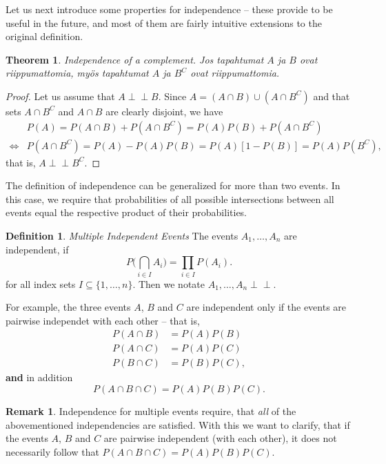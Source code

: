 \documentclass[12pt,a4paper,leqno]{report}
\def\independent{\perp\!\!\!\perp}
\theoremstyle{plain}
\newtheorem{lause}[equation]{Theorem}
\theoremstyle{definition}
\newtheorem{maar}[equation]{Definition}
\newtheorem{remark}[equation]{Remark}
\begin{document}
\bigskip

Let us next introduce some properties for independence -- these provide to be useful in the future, and most of them are fairly intuitive extensions to the original definition.

\begin{lause}\label{lause:indept_complement}
Independence of a complement.  Jos tapahtumat $A$ ja $B$ ovat riippumattomia, myös tapahtumat $A$ ja $B^C$ ovat riippumattomia.
\end{lause}

\begin{proof}
Let us assume that $A \independent B$. Since $A = (A \cap B) \cup (A \cap B^C)$ and that sets $A \cap B^C$ and $A \cap B$ are clearly disjoint, we have
\[
\begin{split}
&P(A) = P(A \cap B) + P(A \cap B^C) = P(A)P(B) + P(A \cap B^C) \quad  \\
\Leftrightarrow &P(A \cap B^C) = P(A) - P(A)P(B) = P(A)[1-P(B)] = P(A)P(B^C),
\end{split}
\]
that is, $A \independent B^C$.
\end{proof}

\bigskip

The definition of independence can be generalized for more than two events. In this case, we require that probabilities of all possible intersections between all events equal the respective product of their probabilities.

\begin{maar}
\emph{Multiple Independent Events}  The events $A_1, \dots , A_n$ are independent, if  
\[
P\Big( \bigcap_{i \in I} A_i \Big) = \prod_{i \in I} P(A_i).
\]
for all index sets $I \subseteq \{1, \dots , n\}$. Then we notate $A_1, \dots , A_n \independent$.
\end{maar}

For example, the three events $A$, $B$ and $C$ are independent only if the events are pairwise independet with each other -- that is,
\[
\begin{split}
P(A \cap B) &= P(A)P(B) \\
P(A \cap C) &= P(A)P(C) \\
P(B \cap C) &= P(B)P(C),
\end{split}
\]
\textbf{and} in addition 
\[
P(A \cap B \cap C) = P(A)P(B)P(C).
\]

\begin{remark}
Independence for multiple events require, that \emph{all} of the abovementioned independencies are satisfied. With this we want to clarify, that if the events $A$, $B$ and $C$ are pairwise independent (with each other), it does not necessarily follow that $P(A \cap B \cap C) = P(A)P(B)P(C)$.
\end{remark}
\end{document}

